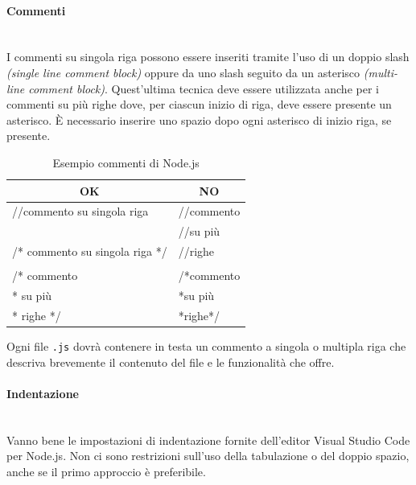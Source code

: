 \paragraph{Commenti}\mbox{}\\[0.4cm]
I commenti su singola riga possono essere inseriti tramite l’uso di un doppio slash \emph{(single line comment block)} oppure da uno slash seguito da un asterisco \emph{(multi-line comment block)}. Quest’ultima tecnica deve essere utilizzata anche per i commenti su più righe dove, per ciascun inizio di riga, deve essere presente un asterisco. È necessario inserire uno spazio dopo ogni asterisco di inizio riga, se presente.
\begin{table} [H]
	\begin{center}
		\begin{tabular}{ | l | l |}
			\multicolumn{1}{c}{\textbf{OK}}&\multicolumn{1}{c}{\textbf{NO}}\\ 
			\hline
			//commento su singola riga & //commento\\
			& //su più\\
			/* commento su singola riga */& //righe\\
			&\\
			/* commento&/*commento\\
			\hspace{0.2cm}* su più&\hspace{0.2cm}*su più\\
			\hspace{0.2cm}* righe */&\hspace{0.2cm}*righe*/\\
			\hline
		\end{tabular}
	\end{center}
	\caption{Esempio commenti di Node.js}
\end{table}
Ogni file \texttt{.js} dovrà contenere in testa un commento a singola o multipla riga che descriva brevemente il contenuto del file e le funzionalità che offre.
\paragraph{Indentazione}\mbox{}\\[0.4cm]
Vanno bene le impostazioni di indentazione fornite dell'editor Visual Studio Code per Node.js. Non ci sono restrizioni sull'uso della tabulazione o del doppio spazio, anche se il primo approccio è preferibile.
